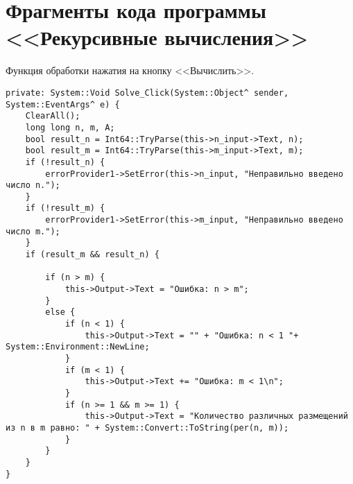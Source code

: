 \section{Фрагменты кода программы <<Рекурсивные вычисления>>}
\label{app:recursive_calculations}


Функция обработки нажатия на кнопку <<Вычислить>>.
\begin{verbatim}
private: System::Void Solve_Click(System::Object^ sender, System::EventArgs^ e) {
	ClearAll();
	long long n, m, A;
	bool result_n = Int64::TryParse(this->n_input->Text, n);
	bool result_m = Int64::TryParse(this->m_input->Text, m);
	if (!result_n) {
		errorProvider1->SetError(this->n_input, "Неправильно введено число n.");
	}
	if (!result_m) {
		errorProvider1->SetError(this->m_input, "Неправильно введено число m.");
	}
	if (result_m && result_n) {

		if (n > m) {
			this->Output->Text = "Ошибка: n > m";
		}
		else {
			if (n < 1) {
				this->Output->Text = "" + "Ошибка: n < 1 "+ System::Environment::NewLine;
			}
			if (m < 1) {
				this->Output->Text += "Ошибка: m < 1\n";
			}
			if (n >= 1 && m >= 1) {
				this->Output->Text = "Количество различных размещений из n в m равно: " + System::Convert::ToString(per(n, m));
			}
		}
	}
}
\end{verbatim}